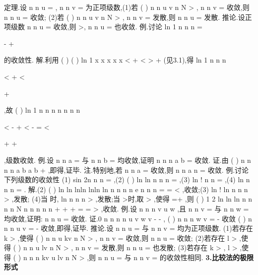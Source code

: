 \textcolor{lyred}{定理}.设
n
n
u
\infty 
=\sum 
,
n
n
v
\infty 
=\sum 
为正项级数,(1)若
(
)
n
n
u
v
n
N
\le 
>
,
n
n
v
\infty 
=\sum 
收敛,则
n
n
u
\infty 
=\sum 
收敛; 
(2)若
(
)
n
n
u
v
n
N
\ge 
>
,
n
n
v
\infty 
=\sum 
发散,则
n
n
u
\infty 
=\sum 
发散. 
\textcolor{lyred}{推论}.设正项级数
n
n
u
\infty 
=\sum 
收敛,则
\alpha 
\forall 
>,
n
n
u\alpha 
\infty 
=\sum 
也收敛. 
\textcolor{lyred}{例}.讨论
ln 1
n
n
n
\infty 
=




-
+








\sum 
的收敛性. 
解.利用
(
)
(
)
ln 1
x
x
x x
x <
+
<
>
+
(见3.1),得
ln 1
n
n
n


<
+
<


+


,故 
(
)
ln 1
n
n
n
n
n n
n


<
-
+
<
-
=
<


+
+


,级数收敛. 
\textcolor{lyred}{例}.设
n
n
a
\infty 
=\sum 
与
n
n
b
\infty 
=\sum 
均收敛,证明
n
n
n
a b
\infty 
=\sum 
收敛. 
证.由
(
)
n
n
n
n
a b
a
b
\le 
\le 
+
,即得,证毕. 
\textcolor{lyred}{注}.特别地,若
n
n
a
\infty 
=\sum 
收敛,则
n
n
a
n
\infty 
=\sum 
收敛. 
\textcolor{lyred}{例}.讨论下列级数的收敛性 
(1)
sin
2n
n
n
\infty 
=\sum 
,(2)
(
)
ln
ln
n
n
n
\infty 
=\sum 
,(3)
ln !
n
n
\infty 
=\sum 
,(4)
ln
n
n
n\alpha 
\infty 
=\sum 
. 
解.(2)
(
)
ln
ln
lnln
lnln
ln
n
n
n
n
e
n
n
n
\cdots 
=
=
<
,收敛;(3)
ln !
ln
n
n
n
>
,发散; 
(4)当
\alpha \le 时, ln
n
n
n
\alpha 
\alpha 
>
,发散;当
\alpha >时,取
\varepsilon >
,使得
\alpha 
\varepsilon 
=+
,则 
(
)
1 2
ln
ln
ln
n
n
n
n
N
n
n
n
n
n
\alpha 
\varepsilon 
\varepsilon 
\varepsilon 
\varepsilon 
+
+
+
=
=
\cdots 
\le 
>
,收敛. 
\textcolor{lyred}{例}.设
n
n
n
v
u
w
\le 
\le 
,且
n
n
v
\infty 
=\sum 
与
n
n
w
\infty 
=\sum 
均收敛,证明:
n
n
u
\infty 
=\sum 
收敛. 
证.0
n
n
n
n
u
v
w
v
\le 
-
\le 
-
,
(
)
n
n
n
w
v
\infty 
=
-
\sum 
收敛
(
)
n
n
n
u
v
\infty 
=
\Rightarrow 
-
\sum 
收敛,即得,证毕. 
\textcolor{lyred}{推论}.设
n
n
u
\infty 
=\sum 
与
n
n
v
\infty 
=\sum 
均为正项级数. 
(1)若存在
k >
,使得
(
)
n
n
u
kv
n
N
\le 
>
,
n
n
v
\infty 
=\sum 
收敛,则
n
n
u
\infty 
=\sum 
收敛; 
(2)若存在
l >
,使得
(
)
n
n
u
lv
n
N
\ge 
>
,
n
n
v
\infty 
=\sum 
发散,则
n
n
u
\infty 
=\sum 
也发散; 
(3)若存在
k >
,
l >
,使得
(
)
n
n
n
kv
u
lv
n
N
\ge 
\ge 
>
,则
n
n
u
\infty 
=\sum 
与
n
n
v
\infty 
=\sum 
的收敛性相同. 
{\bfseries \textcolor{lyred}{3.比较法的极限形式}}

